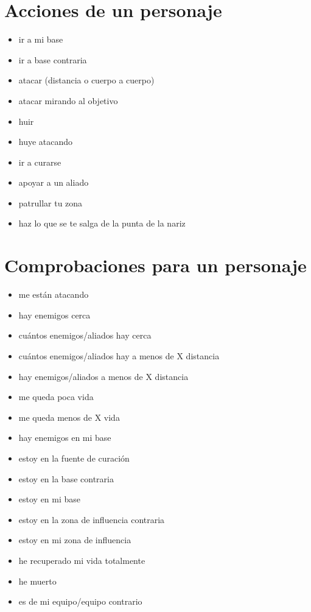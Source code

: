 \documentclass[a4paper,10pt]{article}
\begin{document}
\section{Acciones de un personaje}
\begin{itemize}
 \item ir a mi base
 \item ir a base contraria
 \item atacar (distancia o cuerpo a cuerpo)
 \item atacar mirando al objetivo
 \item huir
 \item huye atacando
 \item ir a curarse
 \item apoyar a un aliado
 \item patrullar tu zona
 \item haz lo que se te salga de la punta de la nariz
\end{itemize}


\section{Comprobaciones para un personaje}
\begin{itemize}
 \item me están atacando
 \item hay enemigos cerca
 \item cuántos enemigos/aliados hay cerca
 \item cuántos enemigos/aliados hay a menos de X distancia
 \item hay enemigos/aliados a menos de X distancia
 \item me queda poca vida
 \item me queda menos de X vida
 \item hay enemigos en mi base
 \item estoy en la fuente de curación
 \item estoy en la base contraria
 \item estoy en mi base
 \item estoy en la zona de influencia contraria
 \item estoy en mi zona de influencia
 \item he recuperado mi vida totalmente
 \item he muerto
 \item es de mi equipo/equipo contrario
\end{itemize}
\end{document}
